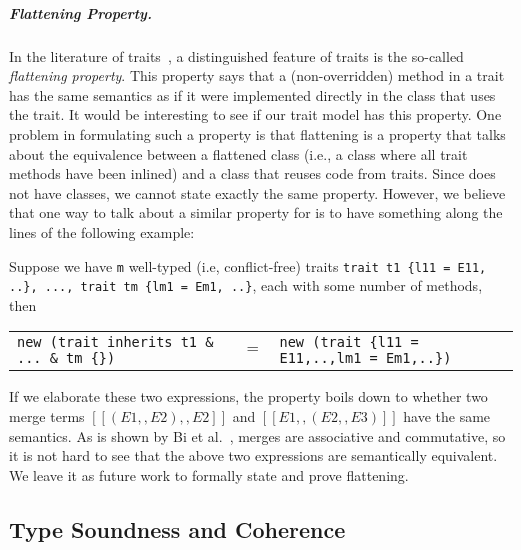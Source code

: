 \subparagraph{Flattening Property.}

In the literature of traits~\cite{Ducasse_2006, scharli2003traits, JOT:issue_2006_05/article4},
a distinguished feature of traits is the
so-called \textit{flattening property}. This property says that a (non-overridden) method in a
trait has the same semantics as if it were implemented directly in the class
that uses the trait. It would be interesting to see if our trait model has this
property. One problem in formulating such a property is that flattening is a
property that talks about the equivalence between a flattened class (i.e., a
class where all trait methods have been inlined) and a class that reuses code
from traits. Since \name does not have classes, we cannot state exactly the same
property. However, we believe that one way to talk about a similar property for \name is to have something
along the lines of the following example:
\begin{example}[Flattening]
  Suppose we have \lstinline$m$ well-typed (i.e, conflict-free) traits \lstinline$trait t1 {l11 = E11, ..}, ..., trait tm {lm1 = Em1, ..}$,
  each with some number of methods, then
  \begin{tabular}{lll}
   \lstinline|new (trait inherits t1 & ... & tm {})| & $=$ & \lstinline|new (trait {l11 = E11,..,lm1 = Em1,..})|
  \end{tabular}
\end{example}
If we elaborate these two expressions, the property boils down to whether two merge terms
$[[(E1 ,, E2) ,, E2]]$ and $[[E1 ,, (E2 ,, E3)]]$
have the same semantics. As is shown by Bi et al.~\cite{xuan_nested}, merges are
associative and commutative, so it is not hard to see that the above two expressions
are semantically equivalent. We leave it as future work to formally state and prove flattening.

\renewcommand{\rulehl}[1]{#1}

\subsection{Type Soundness and Coherence}


